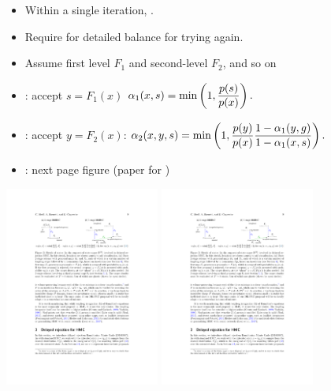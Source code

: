 \documentclass[10pt]{report}
\newcommand{\ddfrac}[2]{\frac{\strut \displaystyle #1}{\strut \displaystyle #2}}
\begin{document}
\begin{itemize}
\item Within a single iteration, .
\item Require  for detailed balance for
  trying again.
\item Assume first level  $F_1$ and second-level $F_2$, and so on
\item {}: accept $s = F_1(x)$ $\alpha_1(x, s) =
  \textrm{min}\left(1, \ddfrac{p(s)}{p(x)} \right).$
\item {}: accept $y = F_2(x)$: $\alpha_2(x, y, s) =
  \textrm{min}\left(1, \ddfrac{p(y)}{p(x)} \ddfrac{1 - \alpha_1(y, g)}{1 -
      \alpha_1(x, s)}
  \right).$
  \item {}: next page figure (paper for
    )
\end{itemize}

\begin{center}
\includegraphics[width=2in]{img/dr-1.pdf}
\includegraphics[width=2in]{img/dr-2.pdf}
\end{center}
\end{document}
